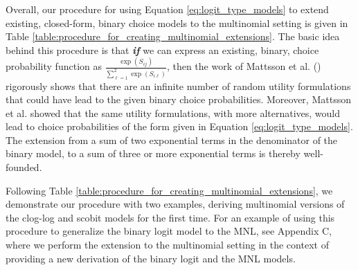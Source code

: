 Overall, our procedure for using Equation \ref{eq:logit_type_models} to extend existing, closed-form, binary choice models to the multinomial setting is given in Table \ref{table:procedure_for_creating_multinomial_extensions}. The basic idea behind this procedure is that \textbf{\textit{if}} we can express an existing, binary, choice probability function as $\frac{ \exp \left( S_{ij} \right) }{ \sum _{ \ell = 1 } ^2 \exp \left( S_{i \ell} \right) }$, then the work of Mattsson et al. (\citeyear{mattsson_extreme_2014}) rigorously shows that there are an infinite number of random utility formulations that could have lead to the given binary choice probabilities. Moreover, Mattsson et al. showed that the same utility formulations, with more alternatives, would lead to choice probabilities of the form given in Equation \ref{eq:logit_type_models}. The extension from a sum of two exponential terms in the denominator of the binary model, to a sum of three or more exponential terms is thereby well-founded.

Following Table \ref{table:procedure_for_creating_multinomial_extensions}, we demonstrate our procedure with two examples, deriving multinomial versions of the clog-log and scobit models for the first time. For an example of using this procedure to generalize the binary logit model to the MNL, see Appendix C, where we perform the extension to the multinomial setting in the context of providing a new derivation of the binary logit and the MNL models.

